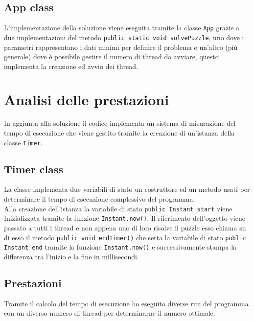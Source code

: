\documentclass{article}
\begin{document}
   \subsection{App class}
   L'implementazione della soluzione viene eseguita tramite la classe \verb|App| grazie a due implementazioni del metodo \verb|public static void solvePuzzle|, uno dove i parametri rappresentano i dati minimi per definire il problema e un'altro (più generale) dove è possibile gestire il numero di thread da avviare, questo implementa la creazione ed avvio dei thread.

   \section{Analisi delle prestazioni}
   In aggiunta alla soluzione il codice implementa un sistema di misurazione del tempo di esecuzione che viene gestito tramite la creazione di un'istanza della classe \verb|Timer|.

   \subsection{Timer class}
   La classe implementa due variabili di stato un costruttore ed un metodo usati per determinare il tempo di esecuzione complessivo del programma.\\

   Alla creazione dell'istanza la variabile di stato \verb|public Instant start| viene Inizializzata tramite la funzione \verb|Instant.now()|. Il riferimento dell'oggetto viene passato a tutti i thread e non appena uno di loro risolve il puzzle esso chiama su di esso il metodo \verb|public void endTimer()| che setta la variabile di stato \verb|public Instant end| tramite la funzione \verb|Instant.now()| e successivamente stampa la differenza tra l'inizio e la fine in millisecondi.
   \newpage %

   \subsection{Prestazioni}
   Tramite il calcolo del tempo di esecuzione ho eseguito diverse run del programma con un diverso numero di thread per determinarne il numero ottimale.\\
\end{document}
